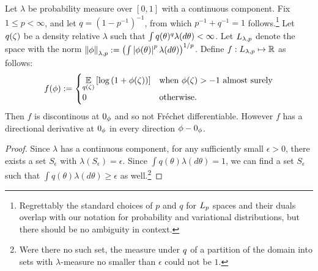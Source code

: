 \begin{lem}


Let $\lambda$ be probability measure over $[0,1]$ with a continuous component.
Fix $1 \le p < \infty$, and let $q = (1 - p^{-1})^{-1}$, from which $p^{-1} +
q^{-1}=1$ follows.\footnote{Regrettably the standard choices of $p$ and $q$ for
${L_{p}}$ spaces and their duals overlap with our notation for probability and
variational distributions, but there should be no ambiguity in context.}  Let
$q(\zeta)$ be a density relative $\lambda$ such that $\int q(\theta)^q
\lambda(d\theta) < \infty$.  Let ${L_{\lambda,p}}$ denote the space with the norm
$\left\Vert\phi\right\Vert_{\lambda,p} := \left(\int \left|\phi(\theta)\right|^p \lambda(d\theta)
\right)^{1/p}$.  Define $f: {L_{\lambda, p}} \mapsto \mathbb{R}$ as follows:
%
\begin{align*}
%
f(\phi) :=
\begin{cases}
    \expect{\q(\zeta)}{\log \left(1 + \phi(\zeta)\right)} &
    \textrm{when }\phi(\zeta) > -1\textrm{ almost surely} \\
    0 & \textrm{otherwise}.
%
\end{cases}
%
\end{align*}
%
Then $f$ is discontinous at $0_\phi$ and so not Fr{\'e}chet differentiable.
However $f$ has a directional derivative at $0_\phi$ in every direction $\phi -
0_\phi$.

\begin{proof}
%
Since $\lambda$ has a continuous component, for any sufficiently small $\epsilon >
0$, there exists a set $S_\epsilon$ with $\lambda(S_\epsilon) = \epsilon$. Since
$\int q(\theta) \lambda(d\theta) = 1$, we can find a set $S_\epsilon$ such that
$\int q(\theta) \lambda(d\theta) \ge \epsilon$ as well.\footnote{Were there no
such set, the measure under $q$ of a partition of the domain into sets with
$\lambda$-measure no smaller than $\epsilon$ could not be $1$.}


\end{proof}
\end{lem}
